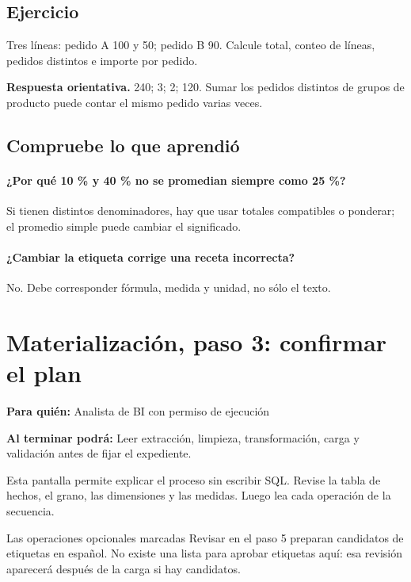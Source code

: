\subsection{Ejercicio}
Tres líneas: pedido A 100 y 50; pedido B 90. Calcule total, conteo de líneas, pedidos distintos e importe por pedido.

\textbf{Respuesta orientativa.} 240; 3; 2; 120. Sumar los pedidos distintos de grupos de producto puede contar el mismo pedido varias veces.

\subsection{Compruebe lo que aprendió}
\paragraph{¿Por qué 10 \% y 40 \% no se promedian siempre como 25 \%?} Si tienen distintos denominadores, hay que usar totales compatibles o ponderar; el promedio simple puede cambiar el significado.

\paragraph{¿Cambiar la etiqueta corrige una receta incorrecta?} No. Debe corresponder fórmula, medida y unidad, no sólo el texto.


\section{Materialización, paso 3: confirmar el plan}
\label{unidad:ETL03}
\textbf{Para quién:} Analista de BI con permiso de ejecución\par
\textbf{Al terminar podrá:} Leer extracción, limpieza, transformación, carga y validación antes de fijar el expediente.

Esta pantalla permite explicar el proceso sin escribir SQL. Revise la tabla de hechos, el grano, las dimensiones y las medidas. Luego lea cada operación de la secuencia.

Las operaciones opcionales marcadas Revisar en el paso 5 preparan candidatos de etiquetas en español. No existe una lista para aprobar etiquetas aquí: esa revisión aparecerá después de la carga si hay candidatos.

